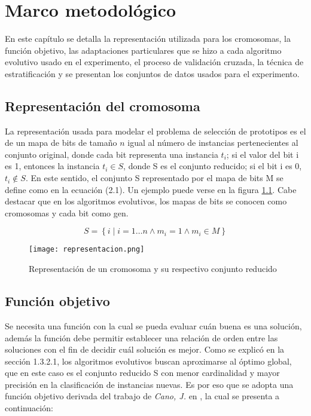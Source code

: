 \chapter{Marco metodológico}
\label{capitulo2}

En este capítulo se detalla la representación utilizada para los cromosomas, la función objetivo, las adaptaciones particulares que se hizo a cada algoritmo evolutivo usado en el experimento, el proceso de validación cruzada, la técnica de estratificación y se presentan los conjuntos de datos usados para el experimento.

\section{Representación del cromosoma}

La representación usada para modelar el problema de selección de prototipos es el de un mapa de bits de tamaño $n$ igual al número de instancias pertenecientes al conjunto original, donde cada bit representa una instancia $t_i$; si el valor del bit i es 1, entonces la instancia $t_i \in S$, donde S es el conjunto reducido; si el bit i es 0, $t_i \notin S$. En este sentido, el conjunto S representado por el mapa de bits M se define como en la ecuación (2.1). Un ejemplo puede verse en la figura \ref{representacion}. Cabe destacar que en los algoritmos evolutivos, los mapas de bits se conocen como cromosomas y cada bit como gen.

\begin{equation}
S = \left\{ i \mid i = 1 \dots n \land m_i = 1 \land m_i \in M \right\}
\end{equation} 

\begin{figure}[]
\centering
\texttt{[image: representacion.png]}
\caption[Representación de un cromosoma y su respectivo conjunto reducido]{Representación de un cromosoma y su respectivo conjunto reducido}
\label{representacion}
\end{figure}

\section{Función objetivo}

Se necesita una función con la cual se pueda evaluar cuán buena es una solución, además la función debe permitir establecer una relación de orden entre las soluciones con el fin de decidir cuál solución es mejor. Como se explicó en la sección 1.3.2.1, los algoritmos evolutivos buscan aproximarse al óptimo global, que en este caso es el conjunto reducido S con menor cardinalidad y mayor precisión en la clasificación de instancias nuevas. Es por eso que se adopta una función objetivo derivada del trabajo de \emph{Cano, J.} en \cite{de2004reduccion}, la cual se presenta a continuación:

